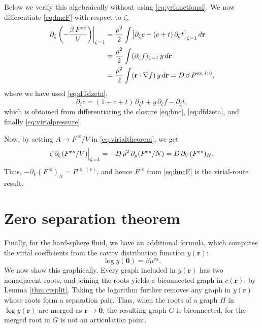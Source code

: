 \documentclass[preprint]{revtex4-1}
\newcommand{\vct}[1]{\mathbf{#1}}
\providecommand{\vr}{} %
\renewcommand{\vr}{\vct{r}}
\newcommand{\supex}[1]{ { { #1 }^{ \mathrm{ex} } } }
\newcommand{\supexv}[1]{ { { #1 }^{ \mathrm{ex}, \, (v) } } }
\newcommand{\Pex}{\supex{P}}
\newcommand{\Pexv}{\supexv{P}}
\newcommand{\Fex}{\supex{F}}
\newcommand{\muex}{\supex{\mu}}
\begin{document}
Below we verify this algebraically\cite{morita1960}
without using \eqref{eq:yrfunctional}.
%
We now differentiate \eqref{eq:hncF} with respect to $\zeta$,
\begin{align}
  \left. \partial_\zeta \left(-\frac{ \beta\,\Fex }{ V }\right) \right|_{\zeta = 1}
&=
\frac{\rho^2}{2} \int
  \bigl[
    \partial_\zeta c - (c + t) \, \partial_\zeta t
  \bigr]_{\zeta = 1} \, d\vr
  \notag \\
&= \frac{\rho^2}{2} \int (\partial_\zeta f)_{\zeta = 1} \, y \, d\vr
  \notag \\
&= \frac{\rho^2}{2} \int (\vr \cdot \nabla f) \, y \, d\vr
= D \, \beta \, \Pexv,
  \notag
\end{align}
%
where we have used \eqref{eq:dTdzeta},
\[
  \partial_\zeta c
  = (1 + c + t) \, \partial_\zeta t
  + y \, \partial_\zeta f - \partial_\zeta t,
\]
which is obtained from differentiating the closure \eqref{eq:hnc},
\eqref{eq:dfdzeta}, and finally \eqref{eq:virialpressure}.

Now, by setting $A \rightarrow \Fex / V$ in \eqref{eq:virialtheorem}, we get
\begin{align}
  \zeta \, \partial_\zeta (\Fex/V) \Big|_{\zeta = 1}
  = -D \, \rho^2 \, \partial_\rho (\Fex/N)
  = D \, \partial_V (\Fex)_N.
    \notag %
\end{align}
Thus, $-\partial_V (\Fex)_N = \Pexv$,
and hence $\Fex$ from \eqref{eq:hncF} is the virial-route result.
%





\section{Zero separation theorem}

Finally, for the hard-sphere fluid, we have an additional formula,
  which computes the virial coefficients
  from the cavity distribution function $y(\vr)$\cite{hoover1962}:
%
\begin{equation}
  \log y(\vct0) = \beta \muex.
  \label{eq:yrzerosep}
\end{equation}
%
We now show this graphically.
%
Every graph included in $y(\vr)$
  has two nonadjacent roots\cite{hansen},
%
  and joining the roots
  yields a biconnected graph in $c(\vr)$,
  by Lemma \ref{thm:crsplit}.
%
Taking the logarithm further
  removes any graph in $y(\vr)$
  whose roots form
  a separation pair\cite{hansen}.
%
Thus, when the roots of a graph $H$ in $\log y(\vr)$
  are merged as $\vr \rightarrow \vct0$,
  the resulting graph $G$ is biconnected,
  for the merged root in $G$ is not an articulation point.
\end{document}
